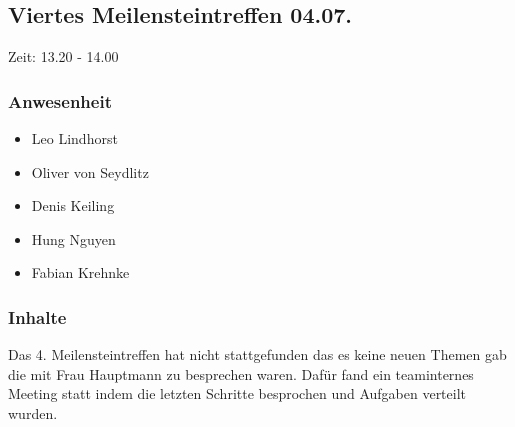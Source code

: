 \subsection{Viertes Meilensteintreffen 04.07.}

Zeit: 13.20 - 14.00

\subsubsection{Anwesenheit}
\begin{itemize}
	\item Leo Lindhorst
	\item Oliver von Seydlitz
	\item Denis Keiling
	\item Hung Nguyen
	\item Fabian Krehnke
\end{itemize}

\subsubsection{Inhalte} 
Das  4. Meilensteintreffen hat nicht stattgefunden das es keine neuen Themen gab die mit Frau Hauptmann zu besprechen waren.
Dafür fand ein teaminternes Meeting statt indem die letzten Schritte besprochen und Aufgaben verteilt wurden.